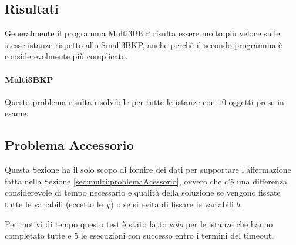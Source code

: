 \subsection{Risultati}
Generalmente il programma Multi3BKP risulta essere molto più veloce sulle 
stesse istanze rispetto allo Small3BKP, anche perchè il secondo programma 
è considerevolmente più complicato. 

\paragraph{Multi3BKP}
Questo problema risulta risolvibile per tutte le istanze con $10$ oggetti prese
in esame. 







\subsection{Problema Accessorio}
Questa Sezione ha il solo scopo di fornire dei dati per supportare l'affermazione
fatta nella Sezione \ref{sec:multi:problemaAcessorio}, ovvero che c'è una 
differenza  considerevole di tempo necessario e qualità della soluzione se 
vengono fissate 
tutte le variabili (eccetto le $\chi$) o se si evita di fissare le variabili
$b$.

Per motivi di tempo questo test è stato fatto \emph{solo} per le istanze che
hanno completato tutte e $5$ le esecuzioni con successo entro i termini del
timeout.



